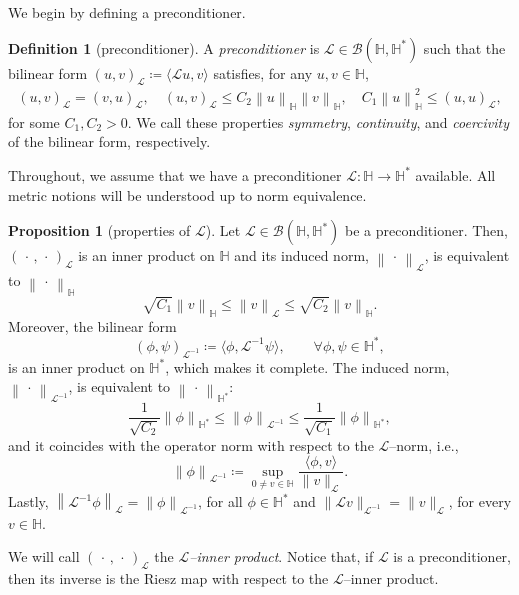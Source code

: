 \documentclass{amsart}
\newcommand{\calB}{{\mathcal{B}}}
\newcommand{\LL}{\mathcal{L}}
\newcommand{\LLinv}{{\mathcal{L}^{-1}}}
\newcommand{\norm}[2]{\left\| #1 \right\| _{#2}}
\newcommand{\pairing}[2]{\bigl\langle #1 , #2 \bigr\rangle}
\newcommand{\HH}{\mathbb{H}}
\theoremstyle{definition}
\newtheorem{prop}[thm]{Proposition}
\newtheorem{defn}[thm]{Definition}
\begin{document}
We begin by defining a preconditioner.

	\begin{defn}[preconditioner]
	\label{def:precon}
A \emph{preconditioner} is $\LL \in \calB(\HH,\HH^*)$ such that the bilinear form
	$
(u,v)_\LL \coloneqq \pairing{\LL u}{v} %
	$
	satisfies, for any $u,v\in\HH$,
	\begin{align*}
(u,v)_\LL =(v,u)_\LL ,
	\quad 
(u,v)_\LL \le C_2 \norm{u}{\HH} \norm{v}{\HH}, 
	\quad 
C_1 \norm{u}{\HH}^2 \le (u,u)_\LL	,
	\end{align*}	
for some $C_1, C_2>0$.	We call these properties \emph{symmetry}, \emph{continuity}, and \emph{coercivity} of the bilinear form, respectively.
	\end{defn}

 Throughout, we assume that we have a preconditioner $\LL : \HH \to \HH^*$ available. All metric notions will be understood up to norm equivalence.

	\begin{prop}[properties of $\LL$]
	\label{prop:LL-Hilbert}
Let $\LL \in \calB(\HH,\HH^*)$ be a preconditioner. Then, $( \, \cdot \, , \, \cdot \,)_\LL$ is an inner product on $\HH$ and its induced norm,
	$
	\norm{ \, \cdot \, }{\LL}
	$,
	is equivalent to $\norm{ \, \cdot \, }{\HH}$ 
	\[
\sqrt{C_1} \norm{v}{\HH}\le\norm{v}{\LL}\le\sqrt{C_2} \norm{v}{\HH}.
	\]%
	Moreover, the bilinear form
	\[
	  (\phi,\psi)_{\LLinv} \coloneqq \pairing{\phi}{\LLinv \psi}, \qquad \forall \phi,\psi \in \HH^*,
	\]
	is an inner product on $\HH^*$, which makes it complete. The induced norm,
	$
	\norm{ \, \cdot \, }{\LLinv} %
	$,
	is equivalent to $\norm{ \, \cdot \, }{\HH^*}$: 
	\[
	\frac{1}{\sqrt{C_2}} \norm{\phi}{\HH^*} 
	\le 
	\norm{\phi}{\LLinv} 
	\le 
	\frac{1}{\sqrt{C_1}} \norm{\phi}{\HH^*},
	\]
and it coincides with the operator norm with respect to the $\LL$--norm, i.e.,  
	\[
\norm{\phi}{\LLinv} \coloneqq \sup_{0\ne v\in\HH} \frac{ \pairing{\phi}{v} }{ \|v\|_\LL }.
	\]
Lastly, $\norm{\LLinv \phi}{\LL}=\norm{\phi}{\LLinv}$, for all $\phi\in \HH^*$ and $
	\|\LL v\|_\LLinv=\|v\|_\LL$, for every $v\in \HH$.
	\end{prop}

We will call $( \, \cdot \, , \, \cdot \,)_\LL$ the \emph{$\LL$--inner product}. Notice that, if $\LL$ is a preconditioner, then its inverse is the Riesz map with respect to the $\LL$--inner product.
\end{document}

